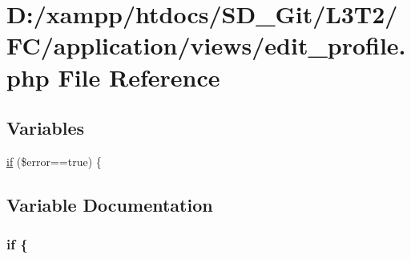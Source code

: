 \hypertarget{edit__profile_8php}{}\section{D\+:/xampp/htdocs/\+S\+D\+\_\+\+Git/\+L3\+T2/\+F\+C/application/views/edit\+\_\+profile.php File Reference}
\label{edit__profile_8php}
\subsection*{Variables}
\begin{DoxyCompactItemize}
\item 
\hyperlink{edit__profile_8php_ac119a6da6237daa1db6b7a695fb8b0d8}{if} (\$error==true) \{
\end{DoxyCompactItemize}


\subsection{Variable Documentation}
\hypertarget{edit__profile_8php_ac119a6da6237daa1db6b7a695fb8b0d8}{}
\subsubsection[{if}]{\setlength{\rightskip}{0pt plus 5cm}if \{}\label{edit__profile_8php_ac119a6da6237daa1db6b7a695fb8b0d8}
